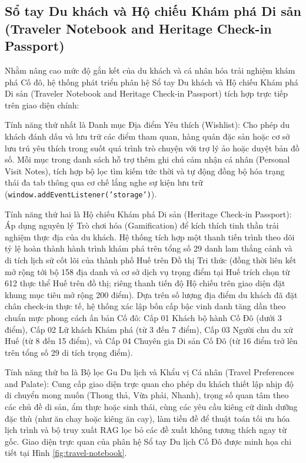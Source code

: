 \subsection{Sổ tay Du khách và Hộ chiếu Khám phá Di sản (Traveler Notebook and Heritage Check-in Passport)}
\label{subsec:ch1-travel-notebook}

Nhằm nâng cao mức độ gắn kết của du khách và cá nhân hóa trải nghiệm khám phá Cố đô, hệ thống phát triển phân hệ Sổ tay Du khách và Hộ chiếu Khám phá Di sản (Traveler Notebook and Heritage Check-in Passport) tích hợp trực tiếp trên giao diện chính:

Tính năng thứ nhất là Danh mục Địa điểm Yêu thích (Wishlist): Cho phép du khách đánh dấu và lưu trữ các điểm tham quan, hàng quán đặc sản hoặc cơ sở lưu trú yêu thích trong suốt quá trình trò chuyện với trợ lý ảo hoặc duyệt bản đồ số. Mỗi mục trong danh sách hỗ trợ thêm ghi chú cảm nhận cá nhân (Personal Visit Notes), tích hợp bộ lọc tìm kiếm tức thời và tự động đồng bộ hóa trạng thái đa tab thông qua cơ chế lắng nghe sự kiện lưu trữ (\texttt{window.addEventListener('storage')}).

Tính năng thứ hai là Hộ chiếu Khám phá Di sản (Heritage Check-in Passport): Áp dụng nguyên lý Trò chơi hóa (Gamification) để kích thích tinh thần trải nghiệm thực địa của du khách. Hệ thống tích hợp một thanh tiến trình theo dõi tỷ lệ hoàn thành hành trình khám phá trên tổng số 29 danh lam thắng cảnh và di tích lịch sử cốt lõi của thành phố Huế trên Đồ thị Tri thức (đồng thời liên kết mở rộng tới bộ 158 địa danh và cơ sở dịch vụ trọng điểm tại Huế trích chọn từ 612 thực thể Huế trên đồ thị; riêng thanh tiến độ Hộ chiếu trên giao diện đặt khung mục tiêu mở rộng 200 điểm). Dựa trên số lượng địa điểm du khách đã đặt chân check-in thực tế, hệ thống xác lập bốn cấp bậc vinh danh tăng dần theo chuẩn mực phong cách ấn bản Cố đô: Cấp 01 Khách bộ hành Cố Đô (dưới 3 điểm), Cấp 02 Lữ khách Khám phá (từ 3 đến 7 điểm), Cấp 03 Người chu du xứ Huế (từ 8 đến 15 điểm), và Cấp 04 Chuyên gia Di sản Cố Đô (từ 16 điểm trở lên trên tổng số 29 di tích trọng điểm).

Tính năng thứ ba là Bộ lọc Gu Du lịch và Khẩu vị Cá nhân (Travel Preferences and Palate): Cung cấp giao diện trực quan cho phép du khách thiết lập nhịp độ di chuyển mong muốn (Thong thả, Vừa phải, Nhanh), trọng số quan tâm theo các chủ đề di sản, ẩm thực hoặc sinh thái, cùng các yêu cầu kiêng cữ dinh dưỡng đặc thù (như ăn chay hoặc kiêng ăn cay), làm tiền đề để thuật toán tối ưu hóa lịch trình và bộ truy xuất RAG lọc bỏ các đề xuất không tương thích ngay từ gốc. Giao diện trực quan của phân hệ Sổ tay Du lịch Cố Đô được minh họa chi tiết tại Hình \ref{fig:travel-notebook}.

